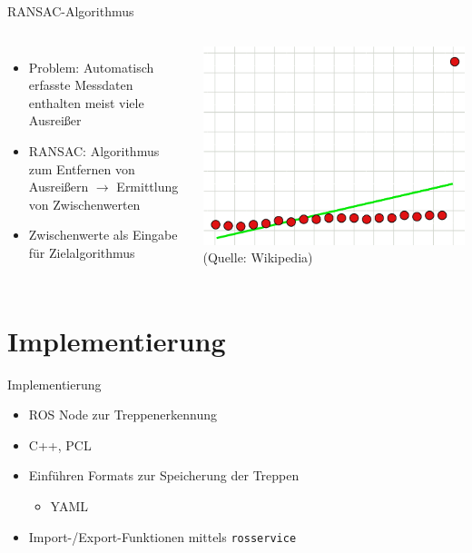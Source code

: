 \documentclass[18pt]{beamer}
\begin{document}
\begin{frame}{RANSAC-Algorithmus}
\begin{columns}
	\begin{itemize}
		\item Problem: Automatisch erfasste Messdaten enthalten meist viele Ausreißer
		\item RANSAC: Algorithmus zum Entfernen von Ausreißern \(\longrightarrow\) Ermittlung von Zwischenwerten
		\item Zwischenwerte als Eingabe für Zielalgorithmus
	\end{itemize}
	\includegraphics[scale=0.28]{images/ausreisser.pdf}
	(Quelle: Wikipedia)
\end{columns}
\end{frame}



\section{Implementierung}

\begin{frame}{Implementierung}
\begin{itemize}
	\item ROS Node zur Treppenerkennung
	\item C++, PCL
	\item Einführen Formats zur Speicherung der Treppen
	\begin{itemize}
		\item YAML
	\end{itemize}
	\item Import-/Export-Funktionen mittels \texttt{rosservice}
\end{itemize}
\end{frame}
\end{document}
